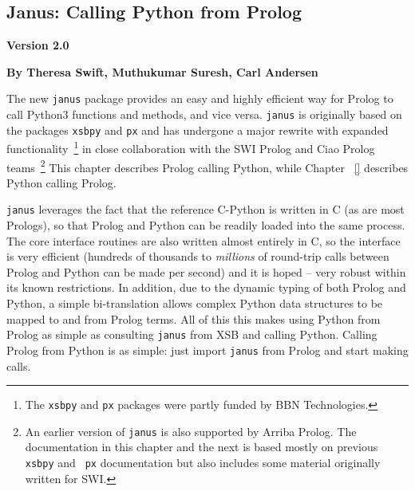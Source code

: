 \newcommand{\janus}{{\tt janus}}
\newcommand{\janusplg}{\texttt{janus-plg}}
\newcommand{\januspy}{\texttt{janus-py}}
\newcommand{\janusxsb}{\texttt{janus\_xsb}}
\newcommand{\jnsversion}{Version 2.0}

\begin{center}
\chapter[Janus: Prolog calling Python]{Janus: Calling Python from Prolog} \label{chap:januspy}
\end{center}

\vspace*{-.30in} 
\begin{center}
{\Large {\bf  \jnsversion}}
\end{center}

\begin{center}
  {\Large {\bf By Theresa Swift, Muthukumar Suresh, Carl Andersen}}
\end{center}

\noindent

%

The new \janus{} package provides an easy and highly efficient way for
Prolog to call Python3 functions and methods, and vice versa.  \janus{}
is originally based on the packages {\tt xsbpy} and {\tt px}
\cite{SwiA23,AndS23} and has undergone a major rewrite with expanded
functionality~\footnote{The {\tt xsbpy} and {\tt px} packages were
partly funded by BBN Technologies.} in close collaboration with the
SWI Prolog and Ciao Prolog teams~\footnote{An earlier version of \janus{}
is also supported by Arriba Prolog. The documentation in this
chapter and the next is based mostly on previous {\tt xsbpy} and {\tt
  px} documentation but also includes some material originally written
for SWI.} This chapter describes Prolog calling Python, while Chapter
~\ref{} describes Python calling Prolog.

\janus{} leverages the fact that the reference C-Python is written in
C (as are most Prologs), so that Prolog and Python can be readily
loaded into the same process. The core interface routines are also
written almost entirely in C, so the interface is very efficient
(hundreds of thousands to {\em millions} of round-trip calls between
Prolog and Python can be made per second) and it is hoped -- very
robust within its known restrictions.  In addition, due to the dynamic
typing of both Prolog and Python, a simple bi-translation allows
complex Python data structures to be mapped to and from Prolog terms.
All of this this makes using Python from Prolog as simple as
consulting \janus{} from XSB and calling Python.  Calling Prolog from
Python is as simple: just import \janus{} from Prolog and start making
calls.


